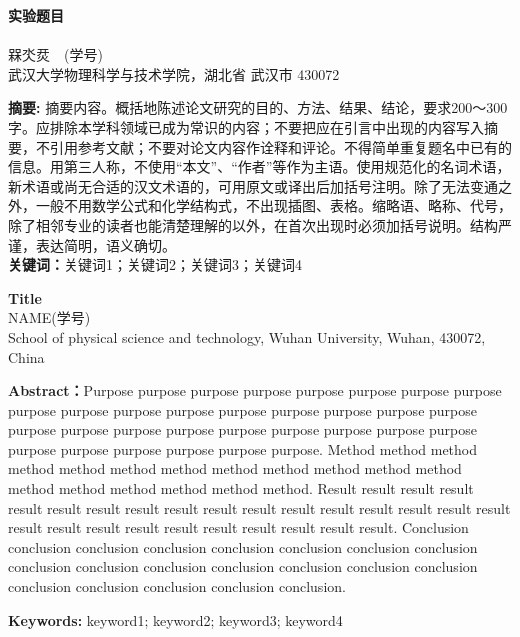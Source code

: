 \documentclass{WHUReport}
\newcommand{\name}{槑氼烎}
\newcommand{\stuid}{学号}
\newcommand{\Name}{NAME}
\newcommand{\newtitle}{实验题目}
\begin{document}
\pagestyle{maincontent} 


\begin{center}
 \textbf{\newtitle}\\
~\\
 \kaishu \name \ \ (\stuid)\\
 \kaishu 武汉大学物理科学与技术学院，湖北省 武汉市 430072\\
\end{center}
\textbf{摘\quad 要:}
摘要内容。概括地陈述论文研究的目的、方法、结果、结论，要求200～300字。应排除本学科领域已成为常识的内容；不要把应在引言中出现的内容写入摘要，不引用参考文献；不要对论文内容作诠释和评论。不得简单重复题名中已有的信息。用第三人称，不使用“本文”、“作者”等作为主语。使用规范化的名词术语，新术语或尚无合适的汉文术语的，可用原文或译出后加括号注明。除了无法变通之外，一般不用数学公式和化学结构式，不出现插图、表格。缩略语、略称、代号，除了相邻专业的读者也能清楚理解的以外，在首次出现时必须加括号说明。结构严谨，表达简明，语义确切。\\
\textbf{关键词：}关键词1；关键词2；关键词3；关键词4
~\\
\begin{center}
	 \textbf{Title}\\
	 \Name\quad (\stuid)\\
	 School of physical science and technology, Wuhan University, Wuhan, 430072, China
\end{center}

\textbf{Abstract：}Purpose purpose purpose purpose purpose purpose purpose purpose purpose purpose purpose purpose purpose purpose purpose purpose purpose purpose purpose purpose purpose purpose purpose purpose purpose purpose purpose purpose purpose purpose purpose purpose. Method method method method method method method method method method method method method method method method method method. Result result result result result result result result result result result result result result result result result result result result result result result result result result result. Conclusion conclusion conclusion conclusion conclusion conclusion conclusion conclusion conclusion conclusion conclusion conclusion conclusion conclusion conclusion conclusion conclusion conclusion conclusion conclusion.

\textbf{Keywords: }keyword1; keyword2; keyword3; keyword4
\end{document}
